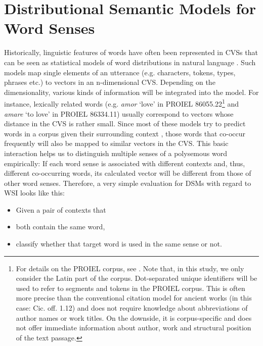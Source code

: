
\section{Distributional Semantic Models for Word Senses}
Historically, linguistic features of words have often been represented in \gls{CVS}s \parencites{mikolovEfficientEstimationWord2013}{daiDocumentEmbeddingParagraph2015}{akbikContextualStringEmbeddings2018} that can be seen as statistical models of word distributions in natural language \parencite[1140]{bengioNeuralProbabilisticLanguage2003}. Such models map single elements of an utterance (e.g. characters, tokens, types, phrases etc.) to vectors in an n-dimensional \gls{CVS}. Depending on the dimensionality, various kinds of information will be integrated into the model. For instance, lexically related words (e.g. \textit{amor} `love' in PROIEL 86055.22\footnote{For details on the PROIEL corpus, see \textcite{haugCreatingParallelTreebank2008}. Note that, in this study, we only consider the Latin part of the corpus. Dot-separated unique identifiers will be used to refer to segments and tokens in the PROIEL corpus. This is often more precise than the conventional citation model for ancient works (in this case: Cic. off. 1.12) and does not require knowledge about abbreviations of author names or work titles. On the downside, it is corpus-specific and does not offer immediate information about author, work and structural position of the text passage.} and \textit{amare} `to love' in PROIEL 86334.11) usually correspond to vectors whose distance in the \gls{CVS} is rather small. Since most of these models try to predict words in a corpus given their surrounding context \parencite[5]{mikolovEfficientEstimationWord2013}, those words that co-occur frequently will also be mapped to similar vectors in the \gls{CVS}. This basic interaction helps us to distinguish multiple senses of a polysemous word empirically: If each word sense is associated with different contexts and, thus, different co-occurring words, its calculated vector will be different from those of other word senses. Therefore, a very simple evaluation for \gls{DSM}s with regard to \gls{WSI} looks like this:
\begin{itemize}
	\item Given a pair of contexts that
	\item both contain the same word,
	\item classify whether that target word is used in the same sense or not.
\end{itemize}
